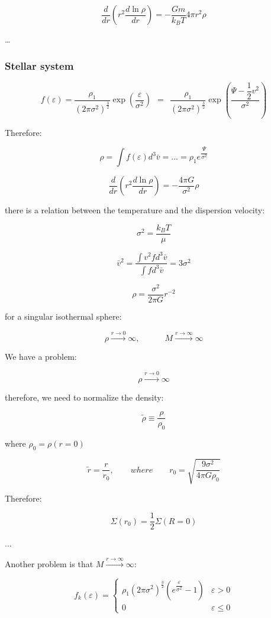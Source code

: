 $$
\dfrac {d}{dr} \left( r^2 \dfrac {d \ln \rho}{dr} \right) = - \dfrac{G m}{k_B T} 4 \pi r^2 \rho
$$

\dots

\subsubsection{Stellar system}

$$
f(\varepsilon) = \dfrac {\rho_1}{(2 \pi \sigma^2)^{\frac 32}} \exp \left( \dfrac{\varepsilon}{\sigma^2} \right) 
\ \ = \ \ 
\dfrac {\rho_1}{(2 \pi \sigma^2)^{\frac 32}} \exp \left( \dfrac{\Psi - \dfrac 12 v^2}{\sigma^2} \right)
$$

Therefore:

$$
\rho = \int f (\varepsilon) d^3 \bar v =  ... = \rho_1 e^{\dfrac{\Psi}{\sigma^2}}
$$

$$
\dfrac{d}{dr} \left( r^2 \dfrac{d \ln \rho}{dr} \right) = - \dfrac{4 \pi G}{\sigma^2} \rho
$$

there is a relation between the temperature and the dispersion velocity:

$$
\sigma^2 = \dfrac{k_B T}{\mu}
$$

$$
\bar v^2 = \dfrac {\int v^2 f d^3 \bar v}{\int f d^3 \bar v} = 3 \sigma^2
$$


$$
\rho = \dfrac {\sigma^2}{2 \pi G} r^{-2}
$$

for a singular isothermal sphere:

$$
\rho \xrightarrow{r \to 0}  \infty
, \qquad \quad
M \xrightarrow{r \to \infty}  \infty
$$

We have a problem:

$$
\rho \xrightarrow{r \to 0}  \infty
$$

therefore, we need to normalize the density:

$$
\tilde \rho \equiv \dfrac{\rho}{\rho_0}
$$

where $\rho_0 = \rho(r = 0)$

$$
\tilde r = \dfrac{r}{r_0}, \qquad where \qquad r_0 = \sqrt {\dfrac{9 \sigma^2}{4 \pi G \rho_0}}
$$

Therefore:

$$
\Sigma (r_0) = \dfrac 12 \Sigma (R = 0)
$$

...


Another problem is that $M \xrightarrow{r \to \infty}  \infty$:

$$
f_k (\varepsilon) = \begin{cases}
    \rho_1 (2 \pi \sigma^2)^{\frac 32} \left( e^{\dfrac{\varepsilon}{\sigma^2}} - 1 \right) & \varepsilon > 0\\
    0 & \varepsilon \le 0
\end{cases}
$$

